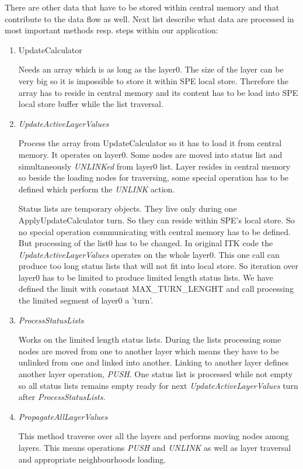 \par
There are other data that have to be stored within central memory and that contribute to the data flow as well.
Next list describe what data are processed in most important methods resp. steps within our application:
\begin{enumerate}
\item UpdateCalculator
\par
Needs an array which is as long as the layer0.
The size of the layer can be very big so it is impossible to store it within SPE local store.
Therefore the array has to reside in central memory and its content has to be load into SPE local store buffer while the list traversal.

\item \emph{UpdateActiveLayerValues}
\par
Process the array from UpdateCalculator so it has to load it from central memory.
It operates on layer0.
Some nodes are moved into status list and simultaneously \emph{UNLINKed} from layer0 list.
Layer resides in central memory so beside the loading nodes for traversing, some special operation has to be defined which perform the \emph{UNLINK} action.
\par
Status lists are temporary objects. They live only during one ApplyUpdateCalculator turn.
So they can reside within SPE's local store.
So no special operation communicating with central memory has to be defined.
But processing of the list0 has to be changed.
In original ITK code the \emph{UpdateActiveLayerValues} operates on the whole layer0.
This one call can produce too long status lists that will not fit into local store.
So iteration over layer0 has to be limited to produce limited length status lists.
We have defined the limit with constant MAX\_TURN\_LENGHT and call processing the limited segment of layer0 a 'turn'.

\item \emph{ProcessStatusLists}
\par
Works on the limited length status lists.
During the lists processing some nodes are moved from one to another layer which means they have to be unlinked from one and linked into another.
Linking to another layer defines another layer operation, \emph{PUSH}.
One status list is processed while not empty so all status lists remains empty ready for next \emph{UpdateActiveLayerValues} turn after \emph{ProcessStatusLists}.

\item \emph{PropagateAllLayerValues}
\par
This method traverse over all the layers and performs moving nodes among layers.
This means operations \emph{PUSH} and \emph{UNLINK} as well as layer traversal and appropriate neighbourhoods loading.
\end{enumerate}

